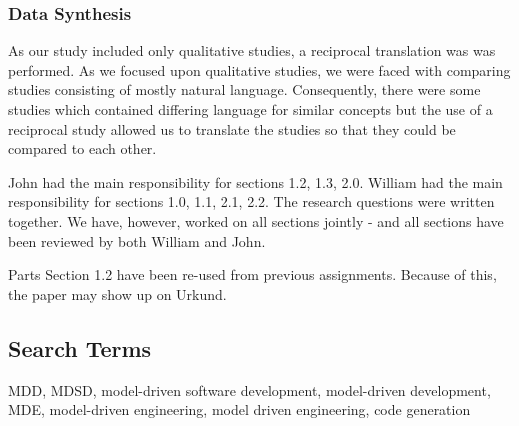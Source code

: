 \documentclass[10pt,twocolumn]{article}
\begin{document}
\subsubsection{Data Synthesis}

As our study included only qualitative studies, a reciprocal translation was was performed. As we focused upon qualitative studies, we were faced with comparing studies consisting of mostly natural language. Consequently, there were some studies which contained differing language for similar concepts but the use of a reciprocal study allowed us to translate the studies so that they could be compared to each other.  





John had the main responsibility for sections 1.2, 1.3, 2.0. William had the main responsibility for sections 1.0, 1.1, 2.1, 2.2. The research questions were written together. We have, however, worked on all sections jointly - and all sections have been reviewed by both William and John. 

Parts Section 1.2 have been re-used from previous assignments. Because of this, the paper may show up on Urkund. 


\begin{appendices}
\section{Search Terms}
MDD, MDSD, model-driven software development, model-driven development, MDE, model-driven engineering, model driven engineering, code generation
\end{appendices}
\end{document}
